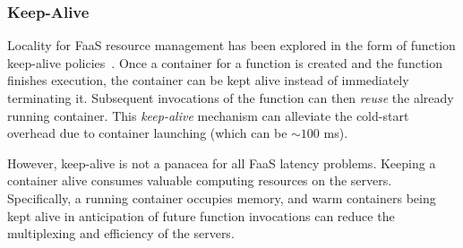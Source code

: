 \subsubsection{Keep-Alive}

Locality for FaaS resource management has been explored in the form of function keep-alive policies~\cite{shahrad_serverless_2020}. 
Once a container for a function is created and the function finishes execution, the container can be kept alive instead of immediately terminating it. 
Subsequent invocations of the function can then \emph{reuse} the already running container.
This \emph{keep-alive} mechanism can alleviate the cold-start overhead due to container launching (which can be $\sim 100$ ms). %

However, keep-alive is not a panacea for all FaaS latency problems. 
Keeping a container alive consumes valuable computing resources on the servers. %
Specifically, a running container occupies memory, and warm containers being kept alive in anticipation of future function invocations can reduce the multiplexing and efficiency of the servers. 

